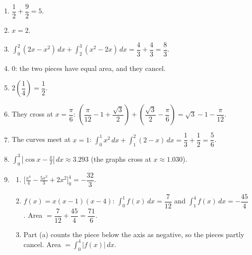 \documentclass[11pt]{article}
\begin{document}
\newpage
\begin{solbox}
\begin{enumerate}[leftmargin=*,itemsep=4pt]
  \item $\dfrac12+\dfrac92=5$.
  \item $x=2$.
  \item $\displaystyle\int_{0}^{2}(2x-x^2)\,dx+\displaystyle\int_{2}^{3}(x^2-2x)\,dx=\dfrac43+\dfrac43=\dfrac83$.
  \item $0$: the two pieces have equal area, and they cancel.
  \item $2\left(\dfrac14\right)=\dfrac12$.
  \item They cross at $x=\dfrac\pi6$: $\left(\dfrac{\pi}{12}-1+\dfrac{\sqrt3}{2}\right)+\left(\dfrac{\sqrt3}{2}-\dfrac\pi6\right)=\sqrt3-1-\dfrac{\pi}{12}$.
  \item The curves meet at $x=1$: $\displaystyle\int_{0}^{1}x^2\,dx+\displaystyle\int_{1}^{2}(2-x)\,dx=\dfrac13+\dfrac12=\dfrac56$.
  \item $\displaystyle\int_{0}^{3}\left|\cos x-\tfrac x2\right|\,dx\approx3.293$ (the graphs cross at $x\approx1.030$).
  \item \begin{enumerate}[label=(\alph*),leftmargin=*,itemsep=3pt]
    \item $\Big[\tfrac{x^4}{4}-\tfrac{5x^3}{3}+2x^2\Big]_0^4=-\dfrac{32}{3}$.
    \item $f(x)=x(x-1)(x-4)$: $\displaystyle\int_{0}^{1}f(x)\,dx=\dfrac{7}{12}$ and $\displaystyle\int_{1}^{4}f(x)\,dx=-\dfrac{45}{4}$. Area $=\dfrac{7}{12}+\dfrac{45}{4}=\dfrac{71}{6}$.
    \item Part (a) counts the piece below the axis as negative, so the pieces partly cancel. Area $=\displaystyle\int_{0}^{4}|f(x)|\,dx$.
  \end{enumerate}
\end{enumerate}
\end{solbox}
\end{document}
